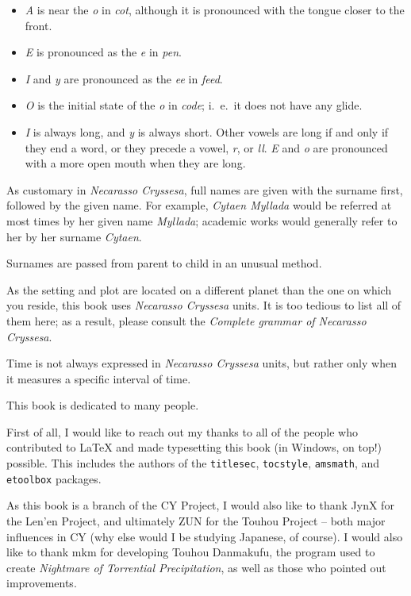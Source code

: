 \begin{itemize}
	\item \emph{A} is near the \emph{o} in \emph{cot}, although it is pronounced with the tongue closer to the front.
	\item \emph{E} is pronounced as the \emph{e} in \emph{pen}.
	\item \emph{I} and \emph{y} are pronounced as the \emph{ee} in \emph{feed}.
	\item \emph{O} is the initial state of the \emph{o} in \emph{code}; i.~e.~it does not have any glide.
	\item \emph{I} is always long, and \emph{y} is always short. Other vowels are long if and only if they end a word, or they precede a vowel, \emph{r}, or \emph{ll}. \emph{E} and \emph{o} are pronounced with a more open mouth when they are long.
\end{itemize}


As customary in \emph{Necarasso Cryssesa}, full names are given with the surname first, followed by the given name. For example, \emph{Cytaen Myllada} would be referred at most times by her given name \emph{Myllada}; academic works would generally refer to her by her surname \emph{Cytaen}.

Surnames are passed from parent to child in an unusual method.

\centeredstars

As the setting and plot are located on a different planet than the one on which you reside, this book uses \emph{Necarasso Cryssesa} units. It is too tedious to list all of them here; as a result, please consult the \emph{Complete grammar of Necarasso Cryssesa}.

Time is not always expressed in \emph{Necarasso Cryssesa} units, but rather only when it measures a specific interval of time.


This book is dedicated to many people.

First of all, I would like to reach out my thanks to all of the people who contributed to \LaTeX{} and made typesetting this book (in Windows, on top!) possible. This includes the authors of the \texttt{titlesec}, \texttt{tocstyle}, \texttt{amsmath}, and \texttt{etoolbox} packages.

As this book is a branch of the CY Project, I would also like to thank JynX for the Len'en Project, and ultimately ZUN for the Touhou Project -- both major influences in CY (why else would I be studying Japanese, of course). I would also like to thank mkm for developing Touhou Danmakufu, the program used to create \emph{Nightmare of Torrential Precipitation}, as well as those who pointed out improvements.

